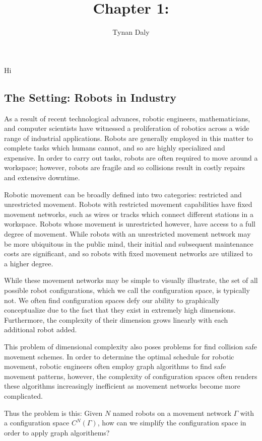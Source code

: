 \documentclass[12pt,oneside]{amsbook}
\title{Chapter 1: }
\author{Tynan Daly}
\begin{document}



\begin{chapter}{Hi}
\subsection{The Setting: Robots in Industry}
As a result of recent technological advances, robotic engineers, mathematicians, and computer scientists have witnessed a proliferation of robotics across a wide range of industrial applications. Robots are generally employed in this matter to complete tasks which humans cannot, and so are highly specialized and expensive. In order to carry out tasks, robots are often required to move around a workspace; however, robots are fragile and so collisions result in costly repairs and extensive downtime.

Robotic movement can be broadly defined into two categories: restricted and unrestricted movement. Robots with restricted movement capabilities have fixed movement networks, such as wires or tracks which connect different stations in a workspace. Robots whose movement is unrestricted however, have access to a full degree of movement. While robots with an unrestricted movement network may be more ubiquitous in the public mind, their initial and subsequent maintenance costs are significant, and so robots with fixed movement networks are utilized to a higher degree. 

While these movement networks may be simple to visually illustrate, the set of all possible robot configurations, which we call the configuration space, is typically not. We often find configuration spaces defy our ability to graphically conceptualize due to the fact that they exist in extremely high dimensions. Furthermore, the complexity of their dimension grows linearly with each additional robot added.

This problem of dimensional complexity also poses problems for find collision safe movement schemes. In order to determine the optimal schedule for robotic movement, robotic engineers often employ graph algorithms to find safe movement patterns, however, the complexity of configuration spaces often renders these algorithms increasingly inefficient as movement networks become more complicated.

Thus the problem is this: Given $N$ named robots on a movement network $\Gamma$ with a configuration space $C^N(\Gamma)$, how can we simplify the configuration space in order to apply graph algorithems?


\end{chapter}
\end{document}
